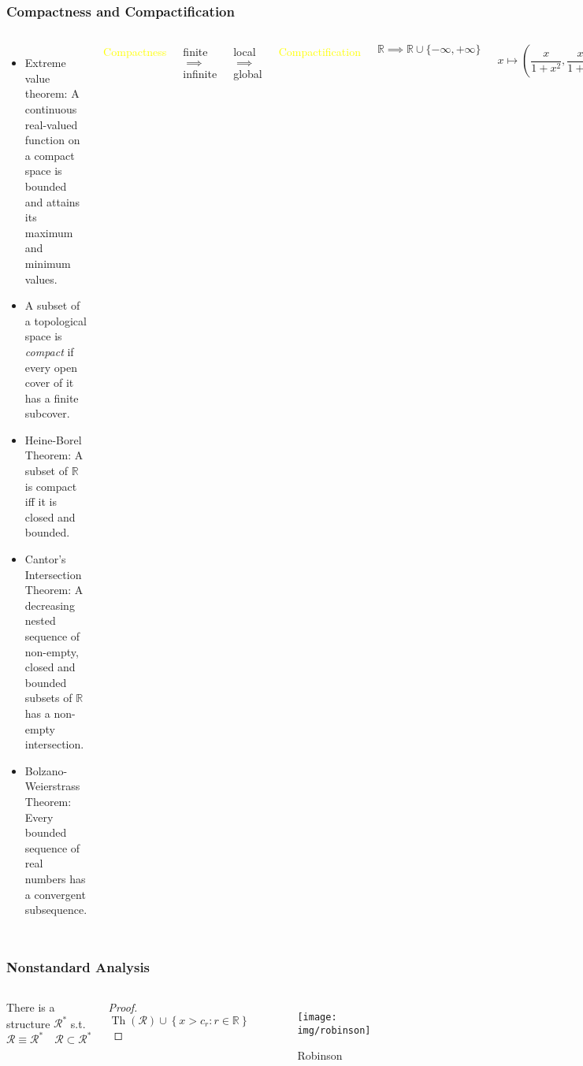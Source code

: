 \documentclass[UTF8,aspectratio=43,11pt,colorlinks,compress,openany]{beamer}%
\begin{document}
\begin{frame}\frametitle{Compactness and Compactification}
\begin{columns}
\begin{itemize}
	\item Extreme value theorem: A continuous real-valued function on a compact space is bounded and attains its maximum and minimum values.
	\item A subset of a topological space is \emph{compact} if every open cover of it has a finite subcover.
	\item Heine-Borel Theorem: A subset of $\mathbb{R}$ is compact iff it is closed and bounded.
	\item Cantor's Intersection Theorem: A decreasing nested sequence of non-empty, closed and bounded subsets of $\mathbb{R}$ has a non-empty intersection.
	\item Bolzano-Weierstrass Theorem: Every bounded sequence of real numbers has a convergent subsequence.
\end{itemize}
\centerline{\textcolor{yellow}{Compactness}}\vspace*{1ex}
\centerline{finite $\implies$ infinite}
\centerline{local $\implies$ global}\vspace*{2ex}
\centerline{\textcolor{yellow}{Compactification}}
\[\mathbb{R}\implies\mathbb{R}\cup\{-\infty,+\infty\}\]
\[x\mapsto\left(\frac{x}{1+x^2},\frac{x^2}{1+x^2}\right)\]
\end{columns}
\end{frame}

\begin{frame}\frametitle{Nonstandard Analysis}
	\begin{columns}
			\begin{theorem}
				There is a structure $\mathcal{R}^*$ s.t.
				\[\mathcal{R}\equiv\mathcal{R}^*\quad \mathcal{R}\subset\mathcal{R}^*\]
			\end{theorem}
			\begin{proof}
				\[\operatorname{Th}(\mathcal{R})\cup\left\{x>c_r: r\in\mathbb{R}\right\}\]
			\end{proof}
			\begin{figure}
				\texttt{[image: img/robinson]}\caption{Robinson}
			\end{figure}
	\end{columns}
\end{frame}
\end{document}
